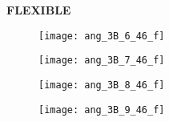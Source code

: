 \documentclass[12pt]{article}
\begin{document}
\begin{figure}[h!]
	\centering
	   \textbf{FLEXIBLE} \\
  \begin{subfigure}[b]{0.15\textwidth}
    \texttt{[image: ang\_3B\_6\_46\_f]}
    \vspace{-15pt} \caption{}
    \label{fig:ang_6_f}
  \end{subfigure}
  \begin{subfigure}[b]{0.15\textwidth}
    \texttt{[image: ang\_3B\_7\_46\_f]}
     \vspace{-15pt} \caption{}
    \label{fig:ang_7_f}
  \end{subfigure}
  \begin{subfigure}[b]{0.15\textwidth}
    \texttt{[image: ang\_3B\_8\_46\_f]}
    \vspace{-15pt} \caption{}
    \label{fig:ang_8_f}
  \end{subfigure}
    \begin{subfigure}[b]{0.15\textwidth}
    \texttt{[image: ang\_3B\_9\_46\_f]}
    \vspace{-15pt} \caption{}
    \label{fig:ang_9_f}
  \end{subfigure}

\end{figure}
\end{document}
